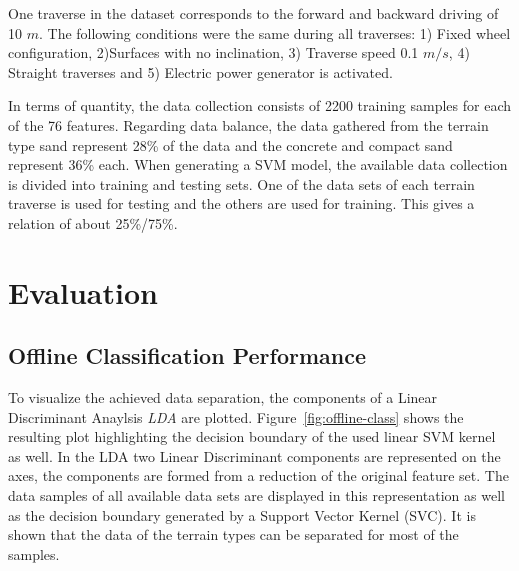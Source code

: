 \documentclass{article}
\begin{document}

One traverse in the dataset corresponds to the forward and backward driving of 10 $m$. The following conditions were the same during all traverses: 1) Fixed wheel configuration, 2)Surfaces with no inclination, 3) Traverse speed 0.1 $m/s$, 4) Straight traverses and 5) Electric power generator is activated.

In terms of quantity, the data collection consists of 2200 training samples for each of the 76 features. 
Regarding data balance, the data gathered from the terrain type sand represent 28\% of the data and the concrete and compact sand represent 36\% each. 
When generating a SVM model, the available data collection is divided into training and testing sets. One of the data sets of each terrain traverse is used for testing and the others are used for training. This gives a relation of about 25\%/75\%.

\section{Evaluation}
\subsection{Offline Classification Performance}

To visualize the achieved data separation, the components of a Linear Discriminant Anaylsis \emph{LDA} are plotted. 
Figure~\ref{fig:offline-class} shows the resulting plot highlighting the decision boundary of the used linear SVM kernel as well. 
In the LDA two Linear Discriminant components are represented on the axes, the components are formed from a reduction of the original feature set.
The data samples of all available data sets are displayed in this representation as well as the decision boundary generated by a Support Vector Kernel (SVC). 
It is shown that the data of the terrain types can be separated for most of the samples.
\end{document}
